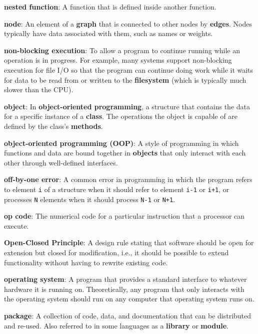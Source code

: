 \documentclass[krantzl]{krantz}
\newcommand{\glosskey}[1]{\textbf{#1}}
\begin{document}
\noindent \textbf{\glosskey{nested function}}: 
A function that is defined inside another function.


\noindent \textbf{\glosskey{node}}: 
An element of a \glosskey{graph} that is connected to other nodes by \glosskey{edges}. Nodes typically have data associated with them, such as names or weights.


\noindent \textbf{\glosskey{non-blocking execution}}: 
To allow a program to continue running while an operation is in progress. For example, many systems support non-blocking execution for file I/O so that the program can continue doing work while it waits for data to be read from or written to the \glosskey{filesystem} (which is typically much slower than the CPU).


\noindent \textbf{\glosskey{object}}: 
In \glosskey{object-oriented programming}, a structure that contains the data for a specific instance of a \glosskey{class}. The operations the object is capable of are defined by the class's \glosskey{methods}.


\noindent \textbf{\glosskey{object-oriented programming} (OOP)}: 
A style of programming in which functions and data are bound together in \glosskey{objects} that only interact with each other through well-defined interfaces.


\noindent \textbf{\glosskey{off-by-one error}}: 
A common error in programming in which the program refers to element \texttt{i} of a structure when it should refer to element \texttt{i-1} or \texttt{i+1}, or processes \texttt{N} elements when it should process \texttt{N-1} or \texttt{N+1}.


\noindent \textbf{\glosskey{op code}}: 
The numerical code for a particular instruction that a processor can execute.


\noindent \textbf{\glosskey{Open-Closed Principle}}: 
A design rule stating that software should be open for extension but closed for modification, i.e., it should be possible to extend functionality without having to rewrite existing code.


\noindent \textbf{\glosskey{operating system}}: 
A program that provides a standard interface to whatever hardware it is running on. Theoretically, any program that only interacts with the operating system should run on any computer that operating system runs on.


\noindent \textbf{\glosskey{package}}: 
A collection of code, data, and documentation that can be distributed and re-used. Also referred to in some languages as a \glosskey{library} or \glosskey{module}.
\end{document}
